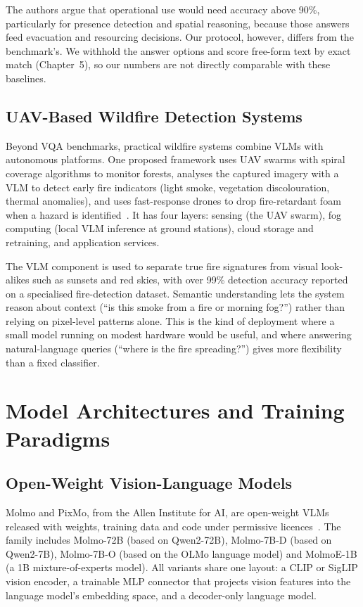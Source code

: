 \documentclass[12pt]{report}
\begin{document}
The authors argue that operational use would need accuracy above 90\%, particularly for presence detection and spatial reasoning, because those answers feed evacuation and resourcing decisions. Our protocol, however, differs from the benchmark's. We withhold the answer options and score free-form text by exact match (Chapter~5), so our numbers are not directly comparable with these baselines.

\subsection{UAV-Based Wildfire Detection Systems}
Beyond VQA benchmarks, practical wildfire systems combine VLMs with autonomous platforms. One proposed framework uses UAV swarms with spiral coverage algorithms to monitor forests, analyses the captured imagery with a VLM to detect early fire indicators (light smoke, vegetation discolouration, thermal anomalies), and uses fast-response drones to drop fire-retardant foam when a hazard is identified~\cite{uavwildfire2024}. It has four layers: sensing (the UAV swarm), fog computing (local VLM inference at ground stations), cloud storage and retraining, and application services.

The VLM component is used to separate true fire signatures from visual look-alikes such as sunsets and red skies, with over 99\% detection accuracy reported on a specialised fire-detection dataset. Semantic understanding lets the system reason about context (``is this smoke from a fire or morning fog?'') rather than relying on pixel-level patterns alone. This is the kind of deployment where a small model running on modest hardware would be useful, and where answering natural-language queries (``where is the fire spreading?'') gives more flexibility than a fixed classifier.

\section{Model Architectures and Training Paradigms}

\subsection{Open-Weight Vision-Language Models}
Molmo and PixMo, from the Allen Institute for AI, are open-weight VLMs released with weights, training data and code under permissive licences~\cite{molmo2024}. The family includes Molmo-72B (based on Qwen2-72B), Molmo-7B-D (based on Qwen2-7B), Molmo-7B-O (based on the OLMo language model) and MolmoE-1B (a 1B mixture-of-experts model). All variants share one layout: a CLIP or SigLIP vision encoder, a trainable MLP connector that projects vision features into the language model's embedding space, and a decoder-only language model.
\end{document}
